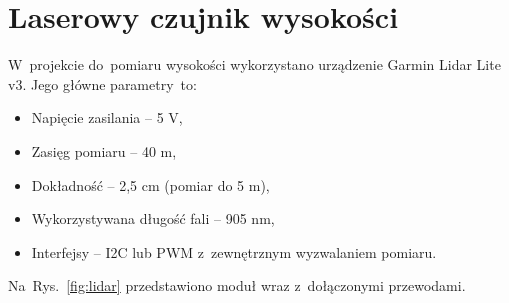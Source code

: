 \section{Laserowy czujnik wysokości}
\label{sec:laser}
W~projekcie do~pomiaru wysokości wykorzystano urządzenie Garmin Lidar Lite v3. 
Jego główne parametry~to:
\begin{itemize}
	\item Napięcie zasilania -- 5 V,
	\item Zasięg pomiaru -- 40 m,
	\item Dokładność -- 2,5 cm (pomiar do 5 m), 
	\item Wykorzystywana długość fali -- 905 nm,
	\item Interfejsy -- I2C lub PWM z~zewnętrznym wyzwalaniem pomiaru.
\end{itemize}
Na~Rys.~\ref{fig:lidar} przedstawiono moduł wraz z~dołączonymi przewodami.




